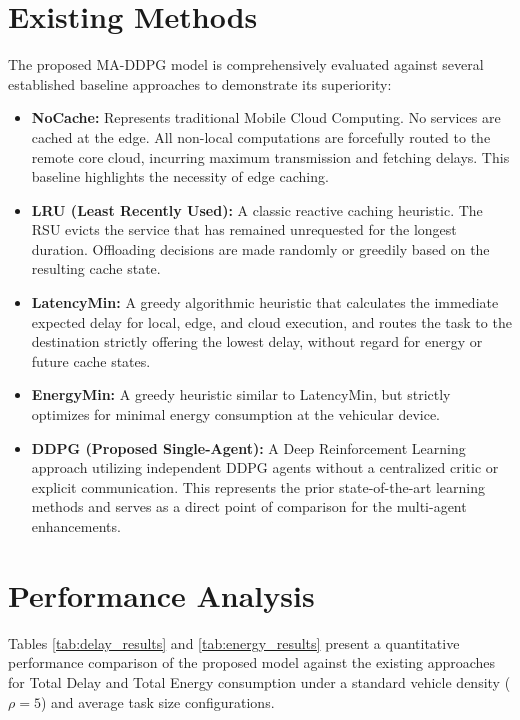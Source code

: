 \documentclass[12pt,a4paper]{report}
\begin{document}
\section{Existing Methods}
The proposed MA-DDPG model is comprehensively evaluated against several established baseline approaches to demonstrate its superiority:
\begin{itemize}
    \item \textbf{NoCache:} Represents traditional Mobile Cloud Computing. No services are cached at the edge. All non-local computations are forcefully routed to the remote core cloud, incurring maximum transmission and fetching delays. This baseline highlights the necessity of edge caching.
    \item \textbf{LRU (Least Recently Used):} A classic reactive caching heuristic. The RSU evicts the service that has remained unrequested for the longest duration. Offloading decisions are made randomly or greedily based on the resulting cache state.
    \item \textbf{LatencyMin:} A greedy algorithmic heuristic that calculates the immediate expected delay for local, edge, and cloud execution, and routes the task to the destination strictly offering the lowest delay, without regard for energy or future cache states.
    \item \textbf{EnergyMin:} A greedy heuristic similar to LatencyMin, but strictly optimizes for minimal energy consumption at the vehicular device.
    \item \textbf{DDPG (Proposed Single-Agent):} A Deep Reinforcement Learning approach utilizing independent DDPG agents without a centralized critic or explicit communication. This represents the prior state-of-the-art learning methods and serves as a direct point of comparison for the multi-agent enhancements.
\end{itemize}

\section{Performance Analysis}
Tables \ref{tab:delay_results} and \ref{tab:energy_results} present a quantitative performance comparison of the proposed model against the existing approaches for Total Delay and Total Energy consumption under a standard vehicle density ($\rho = 5$) and average task size configurations.
\end{document}
